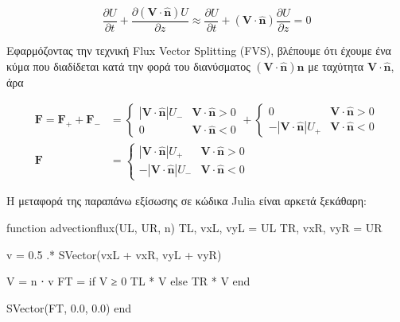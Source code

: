 \begin{equation*}
    \frac{\partial U}{\partial t} + \frac{\partial (\mathbf{V} \cdot \mathbf{\hat{n}}) U}{\partial z} 
    \approx \frac{\partial U}{\partial t} + \left( \mathbf{V} \cdot \mathbf{\hat{n}} \right) \frac{\partial U}{\partial z} = 0
\end{equation*}

Εφαρμόζοντας την τεχνική Flux Vector Splitting (FVS), βλέπουμε ότι έχουμε ένα κύμα που διαδίδεται κατά την φορά του διανύσματος $\left( \mathbf{V} \cdot \mathbf{\hat{n}} \right) \mathbf{\hat{n}}$ με ταχύτητα $\mathbf{V} \cdot \mathbf{\hat{n}}$, άρα

\begin{align*}
    \mathbf{F} = 
    \mathbf{F}_{+} + \mathbf{F}_{-} &=
        \begin{cases}
            \left| \mathbf{V} \cdot \mathbf{\hat{n}} \right | U_{-} & \mathbf{V} \cdot \mathbf{\hat{n}} > 0 \\
            0 & \mathbf{V} \cdot \mathbf{\hat{n}} < 0
        \end{cases}
    +
        \begin{cases}
            0 & \mathbf{V} \cdot \mathbf{\hat{n}} > 0 \\
            -\left| \mathbf{V} \cdot \mathbf{\hat{n}} \right | U_{+} & \mathbf{V} \cdot \mathbf{\hat{n}} < 0
        \end{cases} \\
    \mathbf{F} &=
        \begin{cases}
            \left| \mathbf{V} \cdot \mathbf{\hat{n}} \right | U_{+} & \mathbf{V} \cdot \mathbf{\hat{n}} > 0 \\
            -\left| \mathbf{V} \cdot \mathbf{\hat{n}} \right | U_{-} & \mathbf{V} \cdot \mathbf{\hat{n}} < 0
        \end{cases}
\end{align*}

Η μεταφορά της παραπάνω εξίσωσης σε κώδικα Julia είναι αρκετά ξεκάθαρη:

{\large
\begin{jllisting}[language=julia,style=jlcodestyle]
function advectionflux(UL, UR, n)
    TL, vxL, vyL = UL
    TR, vxR, vyR = UR

    v = 0.5 .* SVector(vxL + vxR, vyL + vyR)

    V = n ⋅ v
    FT = if V ≥ 0
        TL * V
    else
        TR * V
    end

    SVector(FT, 0.0, 0.0)
end
\end{jllisting}
}


